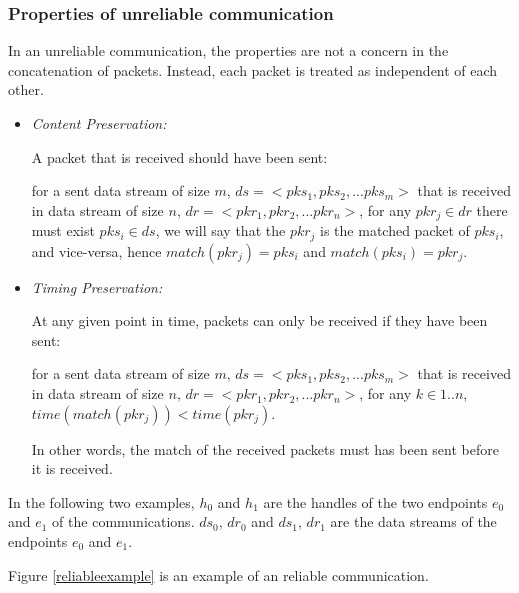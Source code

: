 \documentclass[12pt,oneside]{book}
\begin{document}
\subsubsection{Properties of unreliable communication}\label{unreliablepro}
In an unreliable communication, the properties are not a concern in the concatenation of packets. Instead, each packet is treated as independent of each other.
\begin{itemize}
 \item \textit{ Content Preservation:} 

A packet that is received should have been sent:

for a sent data stream of size $m$, $ds= <pks_1, pks_2, ... pks_m>$ that is received in data stream of size $n$, $dr = <pkr_1, pkr_2, ... pkr_n>$,  for any $pkr_j \in dr$ there must exist $pks_i \in ds$, we will say that the $pkr_j$ is the matched packet of $pks_i$, and vice-versa,  hence $match(pkr_j) = pks_i$  and $match(pks_i) = pkr_j$.

 \item \textit{Timing Preservation:}  

At any given point in time, packets can only be received if they have been sent:

for a sent data stream of size $m$, $ds= <pks_1, pks_2, ... pks_m>$ that is received in data stream of size $n$, $dr = <pkr_1, pkr_2, ... pkr_n>$, for any $k \in {1..n}$, $time(match(pkr_j)) < time(pkr_j)$.

In other words, the match of the received packets must has been sent before it is received.
\end{itemize}


In the following two examples, $h_0$ and $h_1$ are the handles of the two endpoints $e_0$ and $e_1$ of the communications. $ds_0$, $dr_0$ and $ds_1$, $dr_1$ are the data streams of the endpoints $e_0$ and $e_1$. 

Figure \ref{reliableexample} is an example of an reliable communication. 
\end{document}
